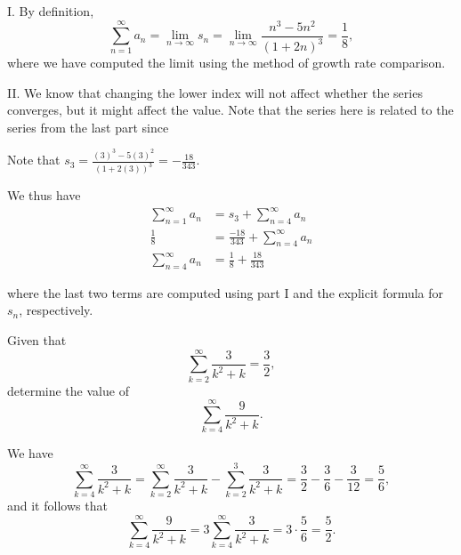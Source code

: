 \documentclass[noauthor, handout]{ximera}
\begin{document}
\begin{freeResponse}
I. By definition, 
$$
\sum_{n=1}^\infty a_n = \lim_{n\rightarrow \infty} s_n = \lim_{n\rightarrow \infty}\frac{n^3-5n^2}{(1+2n)^3} = \frac{1}{8},
$$
where we have computed the limit using the method of growth rate comparison.

II. We know that changing the lower index will not affect whether the series converges, but it might affect the value.  Note that the series here is related to the series from the last part since

\begin{image}
  \end{image}
  
 Note that $s_3 = \frac{(3)^3-5(3)^2}{(1+2(3))^3} = -\frac{18}{343}$.
  
We thus have
\begin{align*}
\sum_{n=1}^\infty a_n &= s_3+\sum_{n=4}^\infty a_n  \\
 \frac{1}{8} &=  \frac{-18}{343}+\sum_{n=4}^\infty a_n \\
 \sum_{n=4}^\infty a_n   &=  \frac{1}{8} +\frac{18}{343}
\end{align*}

where the last two terms are computed using part I and the explicit formula for $s_n$, respectively.

\end{freeResponse}


\begin{problem}
Given that 
$$
\sum_{k=2}^\infty \frac{3}{k^2 + k} = \frac{3}{2},
$$
determine the value of 
$$
\sum_{k=4}^\infty \frac{9}{k^2 + k}.
$$
\end{problem}

\begin{freeResponse}
We have
$$
\sum_{k=4}^\infty \frac{3}{k^2 + k} = \sum_{k=2}^\infty \frac{3}{k^2 + k} - \sum_{k=2}^3 \frac{3}{k^2 + k} = \frac{3}{2} - \frac{3}{6} - \frac{3}{12} = \frac{5}{6},
$$
and it follows that 
$$
\sum_{k=4}^\infty \frac{9}{k^2 + k} = 3 \sum_{k=4}^\infty \frac{3}{k^2 + k} = 3 \cdot \frac{5}{6} = \frac{5}{2}.
$$
\end{freeResponse}
\end{document}
